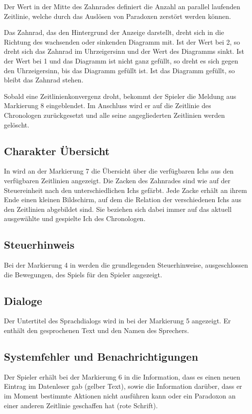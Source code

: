 Der Wert in der Mitte des Zahnrades definiert die Anzahl an parallel laufenden Zeitlinie, welche durch das Auslösen von Paradoxen zerstört werden können.

Das Zahnrad, das den Hintergrund der Anzeige darstellt, dreht sich in die Richtung des wachsenden oder sinkenden Diagramm mit. Ist der Wert bei 2, so dreht sich das Zahnrad im Uhrzeigersinn und der Wert des Diagramms sinkt. Ist der Wert bei 1 und das Diagramm ist nicht ganz gefüllt, so dreht es sich gegen den Uhrzeigersinn, bis das Diagramm gefüllt ist. Ist das Diagramm gefüllt, so bleibt das Zahnrad stehen.

Sobald eine Zeitlinienkonvergenz droht, bekommt der Spieler die Meldung aus Markierung 8 eingeblendet. Im Anschluss wird er auf die Zeitlinie des Chronologen zurückgesetzt und alle seine angegliederten Zeitlinien werden gelöscht.
\subsection{Charakter Übersicht}\label{sec:character-overview}
In  wird an der Markierung 7 die Übersicht über die verfügbaren Ichs aus den verfügbaren Zeitlinien angezeigt. Die Zacken des Zahnrades sind wie auf der Steuereinheit nach den unterschiedlichen Ichs gefärbt. Jede Zacke erhält an ihrem Ende einen kleinen Bildschirm, auf dem die Relation der verschiedenen Ichs aus den Zeitlinien abgebildet sind. Sie beziehen sich dabei immer auf das aktuell ausgewählte und gespielte Ich des Chronologen.
\subsection{Steuerhinweis}
Bei der Markierung 4 in  werden die grundlegenden Steuerhinweise, ausgeschlossen die Bewegungen, des Spiels für den Spieler angezeigt.
\subsection{Dialoge}
Der Untertitel des Sprachdialogs wird in  bei der Markierung 5 angezeigt. Er enthält den gesprochenen Text und den Namen des Sprechers.
\subsection{Systemfehler und Benachrichtigungen}
Der Spieler erhält bei der Markierung 6 in  die Information, dass es einen neuen Eintrag im Datenleser gab (gelber Text), sowie die Information darüber, dass er im Moment bestimmte Aktionen nicht ausführen kann oder ein Paradoxon an einer anderen Zeitlinie geschaffen hat (rote Schrift).
